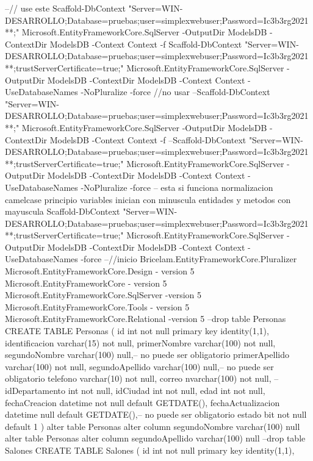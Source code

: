 --// use este
Scaffold-DbContext "Server=WIN-DESARROLLO\DEVSQLSERVER;Database=pruebas;user=simplexwebuser;Password=Ic3b3rg2021**;" Microsoft.EntityFrameworkCore.SqlServer -OutputDir ModelsDB -ContextDir ModelsDB -Context Context -f
Scaffold-DbContext "Server=WIN-DESARROLLO\DEVSQLSERVER;Database=pruebas;user=simplexwebuser;Password=Ic3b3rg2021**;trustServerCertificate=true;" Microsoft.EntityFrameworkCore.SqlServer -OutputDir ModelsDB -ContextDir ModelsDB -Context Context -UseDatabaseNames -NoPluralize -force
//no usar
--Scaffold-DbContext "Server=WIN-DESARROLLO\DEVSQLSERVER;Database=pruebas;user=simplexwebuser;Password=Ic3b3rg2021**;" Microsoft.EntityFrameworkCore.SqlServer -OutputDir ModelsDB -ContextDir ModelsDB -Context Context -f
--Scaffold-DbContext "Server=WIN-DESARROLLO\DEVSQLSERVER;Database=pruebas;user=simplexwebuser;Password=Ic3b3rg2021**;trustServerCertificate=true;" Microsoft.EntityFrameworkCore.SqlServer -OutputDir ModelsDB -ContextDir ModelsDB -Context Context -UseDatabaseNames -NoPluralize -force
 -- esta si funciona normalizacion camelcase principio variables inician con minuscula entidades y metodos con mayuscula
 Scaffold-DbContext "Server=WIN-DESARROLLO\DEVSQLSERVER;Database=pruebas;user=simplexwebuser;Password=Ic3b3rg2021**;trustServerCertificate=true;" Microsoft.EntityFrameworkCore.SqlServer -OutputDir ModelsDB -ContextDir ModelsDB -Context Context -UseDatabaseNames  -force
--//inicio
Bricelam.EntityFrameworkCore.Pluralizer
Microsoft.EntityFrameworkCore.Design - version 5
Microsoft.EntityFrameworkCore - version 5
Microsoft.EntityFrameworkCore.SqlServer -version 5
Microsoft.EntityFrameworkCore.Tools - version 5
Microsoft.EntityFrameworkCore.Relational -version 5
--drop table Personas
CREATE TABLE Personas
(
	id int not null primary key identity(1,1),
	identificacion varchar(15) not null,
	primerNombre varchar(100) not null,
    segundoNombre  varchar(100)  null,-- no puede ser obligatorio
    primerApellido varchar(100) not null,
    segundoApellido varchar(100) null,-- no puede ser obligatorio
    telefono varchar(10) not null,
    correo nvarchar(100) not null,
    --idDepartamento int not null,
    idCiudad int not null,
    edad int not null,
    fechaCreacion datetime not null default GETDATE(),
	fechaActualizacion datetime null default GETDATE(),-- no puede ser obligatorio
    estado bit not null default 1
)
alter table Personas alter column segundoNombre  varchar(100)  null
alter table Personas alter column segundoApellido  varchar(100)  null
--drop table Salones
CREATE TABLE Salones
(
  id int not null primary key identity(1,1),
